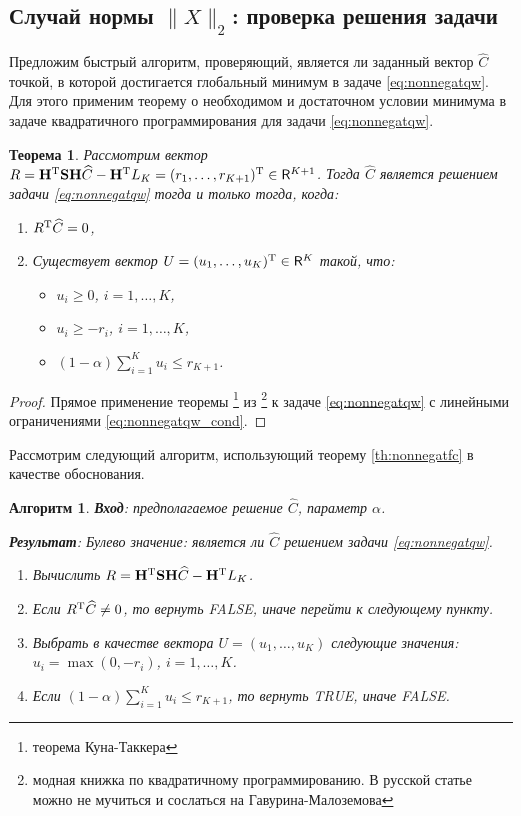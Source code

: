 \documentclass[10pt]{article}
\newtheorem{algorithm}{Алгоритм}
\newtheorem{theorem}{Теорема}
\begin{document}
\subsection{Случай нормы $\|X\|_2$: проверка решения задачи}
Предложим быстрый алгоритм, проверяющий, является ли заданный вектор $\widehat C$ точкой, в которой достигается глобальный минимум в задаче \eqref{eq:nonnegatqw}. Для этого применим теорему о необходимом и достаточном условии минимума в задаче квадратичного программирования для задачи \eqref{eq:nonnegatqw}.
\begin{theorem}
	Рассмотрим вектор $R =  \mathbf{H}^{\mathrm{T}} \mathbf{S} \mathbf{H} \widehat C - \mathbf{H}^{\mathrm{T}} L_K = (r_1, \ldots, r_{K+1})^{\mathrm{T}} \in \mathsf{R}^{K+1}$. Тогда $\widehat C$ является решением задачи \eqref{eq:nonnegatqw} тогда и только тогда, когда:
	\begin{enumerate}
		\item $R^{\mathrm{T}} \widehat C = 0$,
		\item Существует вектор $U = (u_1, \ldots, u_K)^{\mathrm{T}} \in \mathsf{R}^K$ такой, что: \begin{itemize}
			\item $u_i \ge 0$, $i = 1, \ldots, K$,
			\item $u_i \ge -r_i$, $i = 1, \ldots, K$,
			\item $(1 - \alpha) \sum_{i=1}^K u_i \le r_{K+1}$.
		\end{itemize}
	\end{enumerate}
\end{theorem} \label{th:nonnegatfc}
\begin{proof}
	Прямое применение теоремы \footnote{теорема Куна-Таккера} из \footnote{модная книжка по квадратичному программированию. В русской статье можно не мучиться и сослаться на Гавурина-Малоземова} к задаче \eqref{eq:nonnegatqw} с линейными ограничениями \eqref{eq:nonnegatqw_cond}.
\end{proof}

Рассмотрим следующий алгоритм, использующий теорему \ref{th:nonnegatfc} в качестве обоснования.
\begin{algorithm}
	\label{alg:nonnegatfc}
	\textbf{Вход}: предполагаемое решение $\widehat C$, параметр $\alpha$.
	
	\textbf{Результат}:
	Булево значение: является ли $\widehat C$ решением задачи \eqref{eq:nonnegatqw}.
	
	\begin{enumerate}
		\item Вычислить $R = \mathbf{H}^{\mathrm{T}} \mathbf{S} \mathbf{H} \widehat C - \mathbf{H}^{\mathrm{T}} L_K$.
		\item Если $R^{\mathrm{T}} \widehat C \neq 0$, то вернуть FALSE, иначе перейти к следующему пункту.
		\item Выбрать в качестве вектора $U = (u_1, \ldots, u_K)$ следующие значения: $u_i = \max(0, -r_i)$, $i = 1, \ldots, K$.
		\item Если $(1 - \alpha) \sum_{i=1}^K u_i \le r_{K+1}$, то вернуть TRUE, иначе FALSE.
	\end{enumerate}
\end{algorithm}
\end{document}
